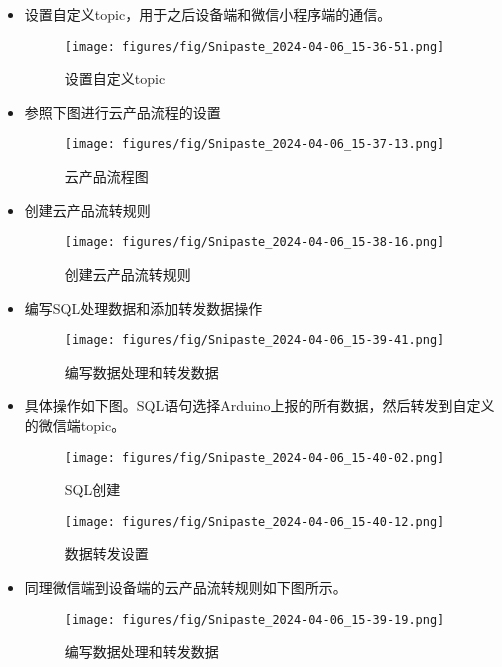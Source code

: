 \documentclass[12pt,hyperref,a4paper,UTF8]{ctexart}
\begin{document}
\begin{itemize}[itemsep=-5pt, topsep=0pt, partopsep=0pt]
    \item 设置自定义topic，用于之后设备端和微信小程序端的通信。
    \begin{figure}[H]
      \centering
      \texttt{[image: figures/fig/Snipaste\_2024-04-06\_15-36-51.png]}
      \caption{设置自定义topic}
      \label{fig:enter-label}
    \end{figure}
    \item 参照下图进行云产品流程的设置
    \begin{figure}[H]
      \centering
      \texttt{[image: figures/fig/Snipaste\_2024-04-06\_15-37-13.png]}
      \caption{云产品流程图}
      \label{fig:enter-label}
    \end{figure}
    \item 创建云产品流转规则
    \begin{figure}[H]
      \centering
      \texttt{[image: figures/fig/Snipaste\_2024-04-06\_15-38-16.png]}
      \caption{创建云产品流转规则}
      \label{fig:enter-label}
    \end{figure}
    \item 编写SQL处理数据和添加转发数据操作
    \begin{figure}[H]
      \centering
      \texttt{[image: figures/fig/Snipaste\_2024-04-06\_15-39-41.png]}
      \caption{编写数据处理和转发数据}
      \label{fig:enter-label}
    \end{figure}
    \item 具体操作如下图。SQL语句选择Arduino上报的所有数据，然后转发到自定义的微信端topic。
    \begin{figure}[H]
      \centering
      \begin{minipage}{.5\textwidth}
        \centering
        \texttt{[image: figures/fig/Snipaste\_2024-04-06\_15-40-02.png]}
        \caption{\small SQL创建}
        \label{fig:image1}
      \end{minipage}%
      \begin{minipage}{.5\textwidth}
        \centering
        \texttt{[image: figures/fig/Snipaste\_2024-04-06\_15-40-12.png]}
        \caption{\small 数据转发设置}
        \label{fig:image2}
      \end{minipage}
    \end{figure}
    \item 同理微信端到设备端的云产品流转规则如下图所示。
    \begin{figure}[H]
      \centering
      \texttt{[image: figures/fig/Snipaste\_2024-04-06\_15-39-19.png]}
      \caption{编写数据处理和转发数据}
      \label{fig:enter-label}
    \end{figure}

\end{itemize}
\end{document}
